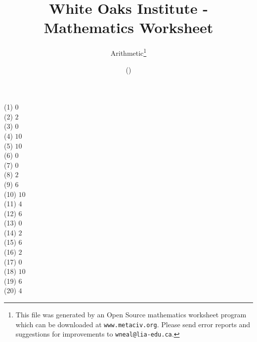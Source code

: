 \documentclass[letter]{article}
\begin{document}
\title{White Oaks Institute - Mathematics Worksheet}
\author{Arithmetic\thanks{This file was generated by an \textsf{Open Source} mathematics worksheet program which can be downloaded at \texttt{www.metaciv.org}. Please send error reports and suggestions for improvements to \texttt{wneal@lia-edu.ca}.}}
\date{\XCfileversion{} (\XCfiledate)}
\maketitle
\begin{multicols}{2}(1) $0$\\(2) $2$\\(3) $0$\\(4) $10$\\(5) $10$\\(6) $0$\\(7) $0$\\(8) $2$\\(9) $6$\\(10) $10$\\(11) $4$\\(12) $6$\\(13) $0$\\(14) $2$\\(15) $6$\\(16) $2$\\(17) $0$\\(18) $10$\\(19) $6$\\(20) $4$\end{multicols}
\end{document}
